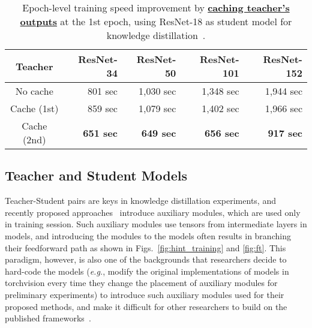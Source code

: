 \documentclass[runningheads]{llncs}
\begin{document}
\begin{table}[t]
    \caption{Epoch-level training speed improvement by \underline{\textbf{caching teacher's outputs}} at the 1st epoch, using ResNet-18 as student model for knowledge distillation~\cite{hinton14distilling}.}
    \begin{center}
    \bgroup
    \setlength{\tabcolsep}{0.25em}
    \def\arraystretch{1.1}
    \small
        \begin{tabular}{|c|r|r|r|r|}
            \hline
            \textbf{Teacher} & \textbf{ResNet-34} & \textbf{ResNet-50} & \textbf{ResNet-101} & \textbf{ResNet-152} \\ \hline
            No cache & 801 sec & 1,030 sec & 1,348 sec & 1,944 sec \\
            Cache (1st) & 859 sec & 1,079 sec & 1,402 sec & 1,966 sec \\
            Cache (2nd) & {\bf 651 sec} & {\bf 649 sec} & {\bf 656 sec} & {\bf 917 sec} \\
            \hline
        \end{tabular}
    \egroup
    \end{center}
\label{table:cacheable_dataset}
\end{table}

\subsection{Teacher and Student Models}
\label{subsec:teacher_student}
Teacher-Student pairs are keys in knowledge distillation experiments, and recently proposed approaches~\cite{romero2015fitnets,yim2017gift,zagoruyko2017paying,heo2019knowledge,ahn2019variational,peng2019correlation,tian2020contrastive,xu2020knowledge,zhang2020prime} introduce auxiliary modules, which are used only in training session.
Such auxiliary modules use tensors from intermediate layers in models, and introducing the modules to the models often results in branching their feedforward path as shown in Figs.~\ref{fig:hint_training} and \ref{fig:ft}.
This paradigm, however, is also one of the backgrounds that researchers decide to hard-code the models (\emph{e.g.}, modify the original implementations of models in torchvision every time they change the placement of auxiliary modules for preliminary experiments) to introduce such auxiliary modules used for their proposed methods, and make it difficult for other researchers to build on the published frameworks~\cite{zagoruyko2017paying,passalis2018learning,heo2019knowledge,park2019relational,tian2020contrastive,xu2020knowledge}.
\end{document}
